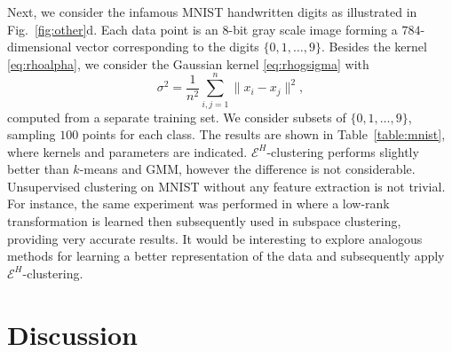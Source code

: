 \documentclass[aps,preprint,nofootinbib,floatfix]{revtex4-1}
\begin{document}
Next, we consider 
the infamous MNIST handwritten digits
as illustrated in Fig.~\ref{fig:other}d.
Each data point is an $8$-bit gray scale
image forming a $784$-dimensional vector 
corresponding to the digits $\{0,1,\dotsc,9 \}$.
Besides the kernel \eqref{eq:rhoalpha}, we
consider the Gaussian kernel \eqref{eq:rhogsigma} with 
\begin{equation}
\label{eq:sigma}
\sigma^2 = \dfrac{1}{n^2} \sum_{i,j=1}^n \| x_i - x_j \|^2 ,
\end{equation}
computed from a separate
training set.
We consider subsets of $\{0,1,\dotsc,9 \}$, 
sampling $100$ points 
for each class. 
The results are shown in Table~\ref{table:mnist}, where kernels
and parameters are indicated.
$\mathcal{E}^H$-clustering performs slightly better than $k$-means
and GMM, however the difference is not considerable.
Unsupervised clustering on MNIST without any feature extraction
is not trivial. For instance,
the same experiment was performed in \cite{Sapiro} where a low-rank
transformation is learned then subsequently used in subspace clustering,
providing very accurate results. It would be interesting to 
explore analogous methods
for learning a better representation of the data and subsequently apply
$\mathcal{E}^H$-clustering.



\section{Discussion}
\label{sec:conclusion}
\end{document}
